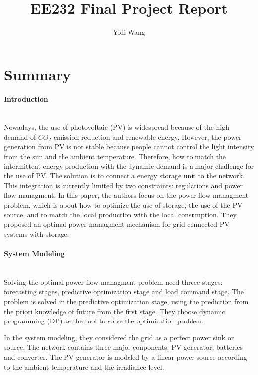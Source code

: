 \documentclass[11pt]{article}
\title{EE232 Final Project Report}
\author{Yidi Wang}
\begin{document}
\maketitle


\vskip 0.1in


\section{Summary}
\paragraph{Introduction} \mbox{} \\
Nowadays, the use of photovoltaic (PV) is widespread because of the high demand of $CO_2$ emission reduction and renewable energy. However, the power generation from PV is not stable because people cannot control the light intensity from the sun and the ambient temperature. Therefore, how to match the intermittent energy production with the dynamic demand is a major challenge for the use of PV. The solution is to connect a energy storage unit to the network. This integration is currently limited by two constraints: regulations and power flow managment. In this paper, the authors focus on the power flow managment problem, which is about how to optimize the use of storage, the use of the PV source, and to match the local production with the local consumption. They proposed an optimal power managment mechanism for grid connected PV systems with storage. 

\paragraph{System Modeling} \mbox{} \\
Solving the optimal power flow managment problem need threee stages: forecasting stages, predictive optimization stage and load command stage. The problem is solved in the predictive optimization stage, using the prediction from the priori knowledge of future from the first stage. They choose dynamic programming (DP) as the tool to solve the optimization problem.

In the system modeling, they considered the grid as a perfect power sink or source. The network contains three major conponents: PV generator, batteries and converter. The PV generator is modeled by a linear power source according to the ambient temperature and the irradiance level. 
\end{document}
